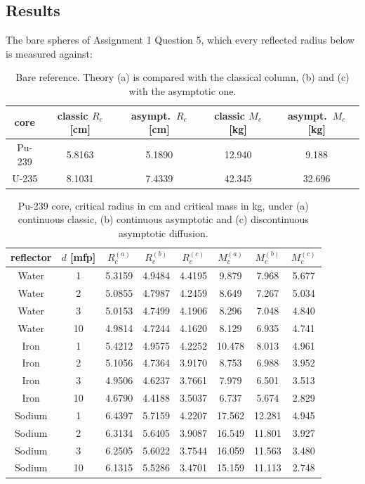\documentclass[11pt]{article}
\begin{document}
\FloatBarrier
\subsection*{Results}

The bare spheres of Assignment 1 Question 5, which every reflected radius below is measured against:

\begin{table}[htbp]
\centering
\begin{tabular}{ccccc}
\toprule
core & classic $R_c$ [cm] & asympt.\ $R_c$ [cm] & classic $M_c$ [kg] & asympt.\ $M_c$ [kg] \\
\midrule
Pu-239 & 5.8163 & 5.1890 & 12.940 & 9.188 \\
U-235  & 8.1031 & 7.4339 & 42.345 & 32.696 \\
\bottomrule
\end{tabular}
\caption{Bare reference. Theory (a) is compared with the classical column, (b) and (c) with the asymptotic one.}
\end{table}

\begin{table}[htbp]
\centering
\begin{tabular}{cccccccc}
\toprule
reflector & $d$ [mfp] & $R_c^{(a)}$ & $R_c^{(b)}$ & $R_c^{(c)}$ & $M_c^{(a)}$ & $M_c^{(b)}$ & $M_c^{(c)}$ \\
\midrule
Water  & 1  & 5.3159 & 4.9484 & 4.4195 & 9.879  & 7.968  & 5.677 \\
Water  & 2  & 5.0855 & 4.7987 & 4.2459 & 8.649  & 7.267  & 5.034 \\
Water  & 3  & 5.0153 & 4.7499 & 4.1906 & 8.296  & 7.048  & 4.840 \\
Water  & 10 & 4.9814 & 4.7244 & 4.1620 & 8.129  & 6.935  & 4.741 \\
\midrule
Iron   & 1  & 5.4212 & 4.9575 & 4.2252 & 10.478 & 8.013  & 4.961 \\
Iron   & 2  & 5.1056 & 4.7364 & 3.9170 & 8.753  & 6.988  & 3.952 \\
Iron   & 3  & 4.9506 & 4.6237 & 3.7661 & 7.979  & 6.501  & 3.513 \\
Iron   & 10 & 4.6790 & 4.4188 & 3.5037 & 6.737  & 5.674  & 2.829 \\
\midrule
Sodium & 1  & 6.4397 & 5.7159 & 4.2207 & 17.562 & 12.281 & 4.945 \\
Sodium & 2  & 6.3134 & 5.6405 & 3.9087 & 16.549 & 11.801 & 3.927 \\
Sodium & 3  & 6.2505 & 5.6022 & 3.7544 & 16.059 & 11.563 & 3.480 \\
Sodium & 10 & 6.1315 & 5.5286 & 3.4701 & 15.159 & 11.113 & 2.748  \\
\bottomrule
\end{tabular}
\caption{Pu-239 core, critical radius in cm and critical mass in kg, under (a) continuous classic, (b) continuous asymptotic and (c) discontinuous asymptotic diffusion.}
\end{table}
\end{document}

